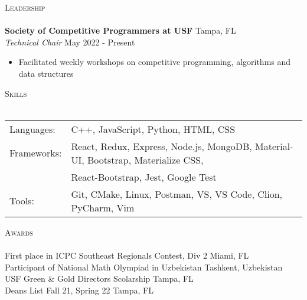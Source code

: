 \documentclass[a4paper]{article}
\newcommand{\lineunder} {
    \vspace*{-8pt} \\
    \hspace*{-18pt} \hrulefill \\
}
\newcommand{\header} [1] {
    {\hspace*{-18pt}\vspace*{6pt} \textsc{#1}}
    \vspace*{-6pt} \lineunder
}
\begin{document}
{\Large \header{Leadership}}
\vspace{1mm}
\textbf{Society of Competitive Programmers at USF} \hfill Tampa, FL\\
\textit{Technical Chair} \hfill May 2022 - Present\\
\vspace{-1mm}
\begin{itemize} \itemsep 1pt
    \item Facilitated weekly workshops on competitive programming, algorithms and data structures
\end{itemize}
{\Large \header{Skills}}
\vspace{1mm}
\begin{tabular}{ l l }
	Languages:  & C++, JavaScript, Python, HTML, CSS                                                 \\
	Frameworks: & React, Redux, Express, Node.js, MongoDB, Material-UI, Bootstrap, Materialize CSS,  \\
	            & React-Bootstrap, Jest, Google Test \\
	Tools:      & Git, CMake, Linux, Postman, VS, VS Code, Clion, PyCharm, Vim                                                 \\
\end{tabular}
\vspace{2mm}

{\Large \header{Awards}}
First place in ICPC Southeast Regionals Contest, Div 2 \hfill Miami, FL\\
Participant of National Math Olympiad in Uzbekistan \hfill Tashkent, Uzbekistan\\
USF Green \& Gold Directors Scolarship \hfill Tampa, FL\\
Dean\textquotesingle{}s List Fall 21, Spring 22 \hfill Tampa, FL\\
\ 
\end{document}
